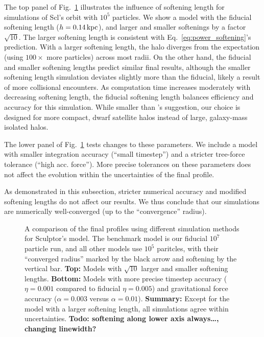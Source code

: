 The top panel of Fig.~\ref{fig:methods_convergence} illustrates the
influence of softening length for simulations of Scl's \smallperi{}
orbit with \(10^5\) particles. We show a model with the fiducial
softening length (\(h=0.14\,{\rm kpc}\)), and larger and smaller softenings
by a factor \(\sqrt{10}\). The larger softening length is consistent
with Eq.~\ref{eq:power_softening}'s prediction. With a larger softening
length, the halo diverges from the expectation (using \(100\times\) more
particles) across most radii. On the other hand, the fiducial and
smaller softening lengths predict similar final results, although the
smaller softening length simulation deviates slightly more than the
fiducial, likely a result of more collisional encounters. As computation
time increases moderately with decreasing softening length, the fiducial
softening length balances efficiency and accuracy for this simulation.
While smaller than \citet{power+2003}'s suggestion, our choice is
designed for more compact, dwarf satellite halos instead of large,
galaxy-mass isolated halos.

The lower panel of Fig.~\ref{fig:methods_convergence} tests changes to
these parameters. We include a model with smaller integration accuracy
(``small timestep'') and a stricter tree-force tolerance (``high acc.
force''). More precise tolerances on these parameters does not affect
the evolution within the uncertainties of the final profile.

As demonstrated in this subsection, stricter numerical accuracy and
modified softening lengths do not affect our results. We thus conclude
that our simulations are numerically well-converged (up to the
``convergence'' radius).

\begin{figure}
\centering
{}
\caption[Isolation method convergence]{A comparison of the final
profiles using different simulation methods for Sculptor's \smallperi{}
model. The benchmark model is our fiducial \(10^7\) particle run, and
all other models use \(10^5\) paritcles, with their ``converged radius''
marked by the black arrow and softening by the vertical bar.
\textbf{Top:} Models with \(\sqrt{10}\) larger and smaller softening
lengths. \textbf{Bottom:} Models with more precise timestep accuracy
(\(\eta=0.001\) compared to fiducial \(\eta=0.005\)) and gravitational
force accuracy (\(\alpha=0.003\) versus \(\alpha=0.01\)).
\textbf{Summary:} Except for the model with a larger softening length,
all simulations agree within uncertainties. \textbf{Todo: softening
along lower axis always\ldots, changing
linewidth?}}\label{fig:methods_convergence}
\end{figure}
